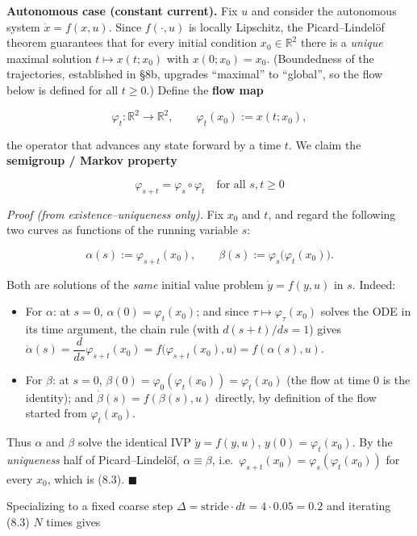\documentclass[
  11pt,
]{article}
\providecommand{\tightlist}{%
  \setlength{\itemsep}{0pt}\setlength{\parskip}{0pt}}
\begin{document}
\textbf{Autonomous case (constant current).} Fix \(u\) and consider the
autonomous system \(\dot{x}=f(x,u)\). Since \(f(\cdot,u)\) is locally
Lipschitz, the Picard--Lindelöf theorem guarantees that for every
initial condition \(x_{0}\in\mathbb{R}^{2}\) there is a \emph{unique}
maximal solution \(t\mapsto x(t;x_{0})\) with \(x(0;x_{0})=x_{0}\).
(Boundedness of the trajectories, established in §8b, upgrades
``maximal'' to ``global'', so the flow below is defined for all
\(t\ge 0\).) Define the \textbf{flow map}

\[
\varphi_{t}:\mathbb{R}^{2}\to\mathbb{R}^{2},\qquad \varphi_{t}(x_{0}):=x(t;x_{0}),
\tag{8.2}
\]

the operator that advances any state forward by a time \(t\). We claim
the \textbf{semigroup / Markov property}

\[
\boxed{\;\varphi_{s+t}=\varphi_{s}\circ\varphi_{t}\quad\text{for all }s,t\ge 0\;}
\tag{8.3}
\]

\emph{Proof (from existence--uniqueness only).} Fix \(x_{0}\) and \(t\),
and regard the following two curves as functions of the running variable
\(s\):

\[
\alpha(s):=\varphi_{s+t}(x_{0}),\qquad \beta(s):=\varphi_{s}\!\big(\varphi_{t}(x_{0})\big).
\]

Both are solutions of the \emph{same} initial value problem
\(\dot{y}=f(y,u)\) in \(s\). Indeed:

\begin{itemize}
\tightlist
\item
  For \(\alpha\): at \(s=0\), \(\alpha(0)=\varphi_{t}(x_{0})\); and
  since \(\tau\mapsto\varphi_{\tau}(x_0)\) solves the ODE in its time
  argument, the chain rule (with \(d(s+t)/ds=1\)) gives
  \(\dot{\alpha}(s)=\dfrac{d}{ds}\varphi_{s+t}(x_{0})=f\big(\varphi_{s+t}(x_{0}),u\big)=f(\alpha(s),u)\).
\item
  For \(\beta\): at \(s=0\),
  \(\beta(0)=\varphi_{0}(\varphi_{t}(x_{0}))=\varphi_{t}(x_{0})\) (the
  flow at time \(0\) is the identity); and
  \(\dot{\beta}(s)=f(\beta(s),u)\) directly, by definition of the flow
  started from \(\varphi_{t}(x_0)\).
\end{itemize}

Thus \(\alpha\) and \(\beta\) solve the identical IVP \(\dot y=f(y,u)\),
\(y(0)=\varphi_{t}(x_{0})\). By the \emph{uniqueness} half of
Picard--Lindelöf, \(\alpha\equiv\beta\),
i.e.~\(\varphi_{s+t}(x_{0})=\varphi_{s}(\varphi_{t}(x_{0}))\) for every
\(x_0\), which is (8.3). \(\blacksquare\)

Specializing to a fixed coarse step
\(\Delta=\text{stride}\cdot dt=4\cdot 0.05=0.2\) and iterating (8.3)
\(N\) times gives
\end{document}
